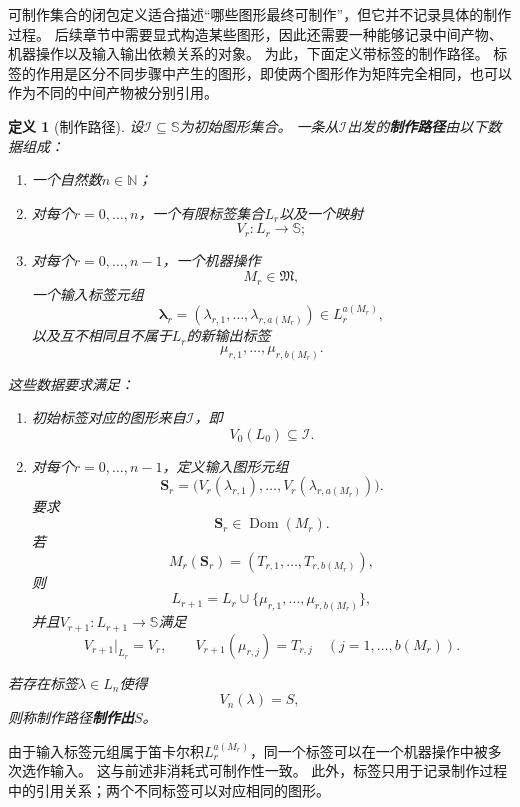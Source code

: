\documentclass[UTF8,fontset=none]{ctexart}
\theoremstyle{cnthm}
\newtheorem{definition}{定义}[section]
\begin{document}
			可制作集合的闭包定义适合描述“哪些图形最终可制作”，但它并不记录具体的制作过程。
			后续章节中需要显式构造某些图形，因此还需要一种能够记录中间产物、机器操作以及输入输出依赖关系的对象。
			为此，下面定义带标签的制作路径。
			标签的作用是区分不同步骤中产生的图形，即使两个图形作为矩阵完全相同，也可以作为不同的中间产物被分别引用。
			
			\begin{definition}[制作路径]
				设$\mathcal{I}\subseteq\mathbb{S}$为初始图形集合。
				一条从$\mathcal{I}$出发的\textbf{制作路径}由以下数据组成：
				\begin{enumerate}
					\item 一个自然数$n\in\mathbb{N}$；
					\item 对每个$r=0,\dots,n$，一个有限标签集合$L_r$以及一个映射
					$$
					V_r:L_r\to\mathbb{S};
					$$
					\item 对每个$r=0,\dots,n-1$，一个机器操作
					$$
					M_r\in\mathfrak{M},
					$$
					一个输入标签元组
					$$
					\boldsymbol{\lambda}_r
					=
					(\lambda_{r,1},\dots,\lambda_{r,a(M_r)})
					\in L_r^{a(M_r)},
					$$
					以及互不相同且不属于$L_r$的新输出标签
					$$
					\mu_{r,1},\dots,\mu_{r,b(M_r)}.
					$$
				\end{enumerate}
				这些数据要求满足：
				\begin{enumerate}
					\item 初始标签对应的图形来自$\mathcal{I}$，即
					$$
					V_0(L_0)\subseteq\mathcal{I}.
					$$
					
					\item 对每个$r=0,\dots,n-1$，定义输入图形元组
					$$
					\mathbf{S}_r
					=
					\bigl(
					V_r(\lambda_{r,1}),\dots,V_r(\lambda_{r,a(M_r)})
					\bigr).
					$$
					要求
					$$
					\mathbf{S}_r\in\operatorname{Dom}(M_r).
					$$
					若
					$$
					M_r(\mathbf{S}_r)
					=
					(T_{r,1},\dots,T_{r,b(M_r)}),
					$$
					则
					$$
					L_{r+1}
					=
					L_r\cup\{\mu_{r,1},\dots,\mu_{r,b(M_r)}\},
					$$
					并且$V_{r+1}:L_{r+1}\to\mathbb{S}$满足
					$$
					V_{r+1}|_{L_r}=V_r,
					\qquad
					V_{r+1}(\mu_{r,j})=T_{r,j}
					\quad(j=1,\dots,b(M_r)).
					$$
				\end{enumerate}
				
				若存在标签$\lambda\in L_n$使得
				$$
				V_n(\lambda)=S,
				$$
				则称制作路径\textbf{制作出}$S$。
			\end{definition}
			
			由于输入标签元组属于笛卡尔积$L_r^{a(M_r)}$，同一个标签可以在一个机器操作中被多次选作输入。
			这与前述非消耗式可制作性一致。
			此外，标签只用于记录制作过程中的引用关系；两个不同标签可以对应相同的图形。
			
\end{document}
